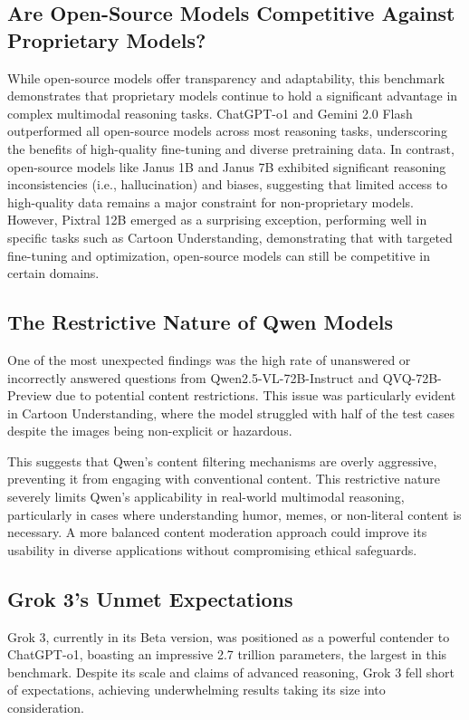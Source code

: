 \subsection{Are Open-Source Models Competitive Against Proprietary Models?}

While open-source models offer transparency and adaptability, this benchmark demonstrates that proprietary models continue to hold a significant advantage in complex multimodal reasoning tasks. ChatGPT-o1 and Gemini 2.0 Flash outperformed all open-source models across most reasoning tasks, underscoring the benefits of high-quality fine-tuning and diverse pretraining data. In contrast, open-source models like Janus 1B and Janus 7B exhibited significant reasoning inconsistencies (i.e., hallucination) and biases, suggesting that limited access to high-quality data remains a major constraint for non-proprietary models. However, Pixtral 12B emerged as a surprising exception, performing well in specific tasks such as Cartoon Understanding, demonstrating that with targeted fine-tuning and optimization, open-source models can still be competitive in certain domains.


\subsection{The Restrictive Nature of Qwen Models}

One of the most unexpected findings was the high rate of unanswered or incorrectly answered questions from Qwen2.5-VL-72B-Instruct and QVQ-72B-Preview due to potential content restrictions. This issue was particularly evident in Cartoon Understanding, where the model struggled with half of the test cases despite the images being non-explicit or hazardous.

This suggests that Qwen’s content filtering mechanisms are overly aggressive, preventing it from engaging with conventional content. This restrictive nature severely limits Qwen's applicability in real-world multimodal reasoning, particularly in cases where understanding humor, memes, or non-literal content is necessary. A more balanced content moderation approach could improve its usability in diverse applications without compromising ethical safeguards.

\subsection{Grok 3's Unmet Expectations} 

Grok 3, currently in its Beta version, was positioned as a powerful contender to ChatGPT-o1, boasting an impressive 2.7 trillion parameters, the largest in this benchmark. Despite its scale and claims of advanced reasoning, Grok 3 fell short of expectations, achieving underwhelming results taking its size into consideration.

